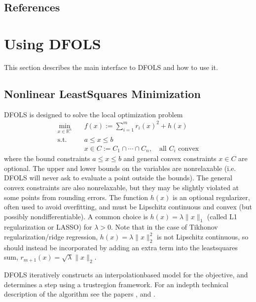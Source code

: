 \documentclass[letterpaper,10pt,english]{sphinxmanual}
\begin{document}
\section{References}
\label{\detokenize{info:references}}
\sphinxstepscope


\chapter{Using DFO\sphinxhyphen{}LS}
\label{\detokenize{userguide:using-dfo-ls}}\label{\detokenize{userguide::doc}}
\sphinxAtStartPar
This section describes the main interface to DFO\sphinxhyphen{}LS and how to use it.


\section{Nonlinear Least\sphinxhyphen{}Squares Minimization}
\label{\detokenize{userguide:nonlinear-least-squares-minimization}}
\sphinxAtStartPar
DFO\sphinxhyphen{}LS is designed to solve the local optimization problem
\begin{equation*}
\begin{split}\min_{x\in\mathbb{R}^n}  &\quad  f(x) := \sum_{i=1}^{m}r_{i}(x)^2 + h(x) \\
\text{s.t.} &\quad  a \leq x \leq b\\
            &\quad x \in C := C_1 \cap \cdots \cap C_n, \quad \text{all $C_i$ convex}\end{split}
\end{equation*}
\sphinxAtStartPar
where the bound constraints \(a \leq x \leq b\) and general convex constraints \(x\in C\) are optional. The upper and lower bounds on the variables are non\sphinxhyphen{}relaxable (i.e. DFO\sphinxhyphen{}LS will never ask to evaluate a point outside the bounds). The general convex constraints are also non\sphinxhyphen{}relaxable, but they may be slightly violated at some points from rounding errors.
The function \(h(x)\) is an optional regularizer, often used to avoid overfitting, and must be Lipschitz continuous and convex (but possibly non\sphinxhyphen{}differentiable).
A common choice is \(h(x)=\lambda \|x\|_1\) (called L1 regularization or LASSO) for \(\lambda>0\).
Note that in the case of Tikhonov regularization/ridge regression, \(h(x)=\lambda\|x\|_2^2\) is not Lipschitz continuous, so should instead be incorporated by adding an extra term into the least\sphinxhyphen{}squares sum, \(r_{m+1}(x)=\sqrt{\lambda} \|x\|_2\).

\sphinxAtStartPar
DFO\sphinxhyphen{}LS iteratively constructs an interpolation\sphinxhyphen{}based model for the objective, and determines a step using a trust\sphinxhyphen{}region framework.
For an in\sphinxhyphen{}depth technical description of the algorithm see the papers ,  and .
\end{document}
